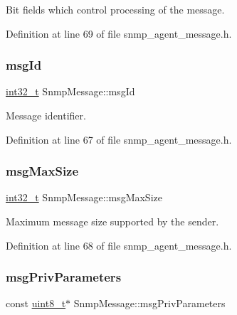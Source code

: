 Bit fields which control processing of the message. 



Definition at line 69 of file snmp\+\_\+agent\+\_\+message.\+h.

\mbox{\label{structSnmpMessage_ab3f065667ee47978ab059eb754f17150}} 
\subsubsection{\texorpdfstring{msg\+Id}{msgId}}
{\footnotesize\ttfamily \hyperlink{stdint_8h_ab1967d8591af1a4e48c37fd2b0f184d0}{int32\+\_\+t} Snmp\+Message\+::msg\+Id}



Message identifier. 



Definition at line 67 of file snmp\+\_\+agent\+\_\+message.\+h.

\mbox{\label{structSnmpMessage_a078984d1faa7cb4eb2e7978261c8cba6}} 
\subsubsection{\texorpdfstring{msg\+Max\+Size}{msgMaxSize}}
{\footnotesize\ttfamily \hyperlink{stdint_8h_ab1967d8591af1a4e48c37fd2b0f184d0}{int32\+\_\+t} Snmp\+Message\+::msg\+Max\+Size}



Maximum message size supported by the sender. 



Definition at line 68 of file snmp\+\_\+agent\+\_\+message.\+h.

\mbox{\label{structSnmpMessage_a06518359392967750bc6139130d489ef}} 
\subsubsection{\texorpdfstring{msg\+Priv\+Parameters}{msgPrivParameters}}
{\footnotesize\ttfamily const \hyperlink{stdint_8h_aba7bc1797add20fe3efdf37ced1182c5}{uint8\+\_\+t}$\ast$ Snmp\+Message\+::msg\+Priv\+Parameters}



